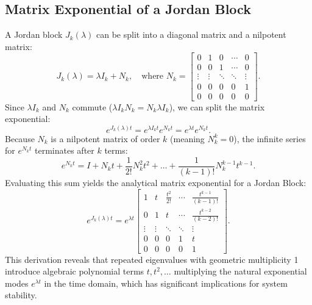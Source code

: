 \subsection{Matrix Exponential of a Jordan Block}
A Jordan block $J_k(\lambda)$ can be split into a diagonal matrix and a nilpotent matrix:
\begin{equation}
    J_k(\lambda) = \lambda I_k + N_k, \quad \text{where } N_k = \begin{bmatrix}
        0 & 1 & 0 & \cdots & 0 \\
        0 & 0 & 1 & \cdots & 0 \\
        \vdots & \vdots & \ddots & \ddots & \vdots \\
        0 & 0 & 0 & 0 & 1 \\
        0 & 0 & 0 & 0 & 0
\end{bmatrix} .
\end{equation}
Since $\lambda I_k$ and $N_k$ commute ($\lambda I_k N_k = N_k \lambda I_k$), we can split the matrix exponential:
\begin{equation}
e^{J_k(\lambda) t} = e^{\lambda I_k t} e^{N_k t} = e^{\lambda t} e^{N_k t} .
\end{equation}
Because $N_k$ is a nilpotent matrix of order $k$ (meaning $N_k^k = 0$), the infinite series for $e^{N_k t}$ terminates after $k$ terms:
\begin{equation}
e^{N_k t} = I + N_k t + \frac{1}{2!} N_k^2 t^2 + \dots + \frac{1}{(k-1)!} N_k^{k-1} t^{k-1} .
\end{equation}
Evaluating this sum yields the analytical matrix exponential for a Jordan Block:
\begin{equation}
    e^{J_k(\lambda) t} = e^{\lambda t} \begin{bmatrix}
        1 & t & \frac{t^2}{2!} & \cdots & \frac{t^{k-1}}{(k-1)!} \\
        0 & 1 & t & \cdots & \frac{t^{k-2}}{(k-2)!} \\
        \vdots & \vdots & \ddots & \ddots & \vdots \\
        0 & 0 & 0 & 1 & t \\
        0 & 0 & 0 & 0 & 1
\end{bmatrix} .
\end{equation}
This derivation reveals that repeated eigenvalues with geometric multiplicity 1 introduce algebraic polynomial terms $t, t^2, \dots$ multiplying the natural exponential modes $e^{\lambda t}$ in the time domain, which has significant implications for system stability.
